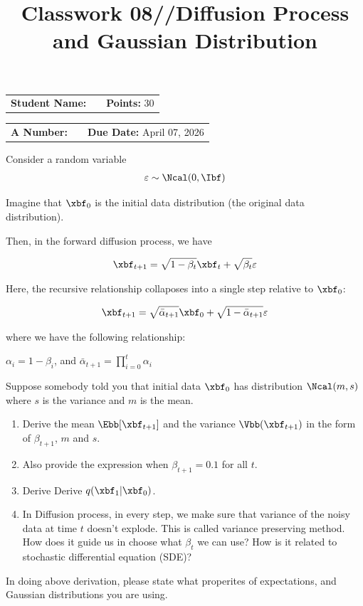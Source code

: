 \documentclass[12pt, xcolor=dvipsnames,svgnames,x11names]{article}
\makeatletter
\newcommand{\hw}{Classwork 08//Diffusion Process and Gaussian Distribution}
\newcommand{\duedate}{April 07, 2026}
\renewcommand{\maketitle}{%
    \vspace*{0.2cm}
    \begin{center}
        \begin{tcolorbox}[
            enhanced,
            colback=white,
            colframe=headerRed,
            arc=0mm,
            title={\textcolor{white}{\bfseries \@title}},
            coltitle=white,
            fonttitle=\bfseries\large,
            attach boxed title to top left={xshift=10pt, yshift=-\tcboxedtitleheight/2},
            boxed title style={sharp corners, colback=headerRed, frame hidden}
        ]
        \large
        \vspace{10pt}
\noindent
\begin{tabular}{@{}p{3.5cm}p{6cm}r@{}}
\textbf{Student Name:} & \underline{\hspace{6cm}} & \textbf{Points:} 30 \\
\end{tabular}

\vspace{10pt}

\noindent
\begin{tabular}{@{}p{3.5cm}p{6cm}r@{}}
\textbf{A Number:} & \underline{\hspace{6cm}} & \textbf{Due Date:} \duedate \\
\end{tabular}
        \end{tcolorbox}
    \end{center}
    \vspace{10pt}
}
\makeatother
\begin{document}
\title{\hw}
\maketitle


Consider a random variable
\begin{align*}
\varepsilon \sim \Ncal (0, \Ibf)
\end{align*}

Imagine that $\xbf_0$ is the initial data distribution (the original data distribution). 

Then, in the forward diffusion process, we have 

\begin{align*}
    \xbf_{t+1}  = \sqrt{1 - \beta_t}\xbf_t + \sqrt{\beta_t}\varepsilon
\end{align*}

Here, the recursive relationship collaposes into a single step relative to $\xbf_0$:

\begin{align*}
\xbf_{t+1} = \sqrt{\bar{\alpha}_{t+1}}\xbf_0 + \sqrt{1 - \bar{\alpha}_{t+1}}\varepsilon
\end{align*}

where we have the following relationship:

$\alpha_i = 1 - \beta_i$, and $\bar{\alpha}_{t+1} = \prod_{i=0}^t \alpha_i$


Suppose somebody told you that initial data $\xbf_0$ has distribution $\Ncal(m,s)$ where $s$ is the variance and $m$ is the mean.


\begin{enumerate}
\item Derive the mean $\Ebb[\xbf_{t+1}]$ and the variance $\Vbb(\xbf_{t+1})$ in the form of $\beta_{t+1}$, $m$ and $s$.

\item Also provide the expression when $\beta_{t+1} = 0.1$ for all $t$.

\item Derive Derive $q(\xbf_1 | \xbf_0)$.

\item In Diffusion process, in every step, we make sure that variance of the noisy data at time $t$ doesn't explode. This is called variance preserving method. How does it guide us in choose what $\beta_t$ we can use? How is it related to stochastic differential equation (SDE)?
\end{enumerate}

In doing above derivation, please state what properites of expectations, and Gaussian distributions you are using.
\end{document}
